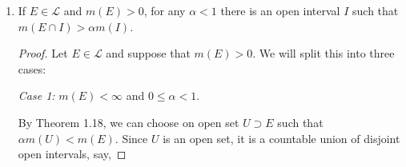 \documentclass[11pt,oneside,english]{amsart}
\theoremstyle{definition}
\newcommand{\MC}[1]{\mathcal{#1}}
\begin{document}
\begin{enumerate}
\begin{enumerate}
\begin{proof}
Let $E\subset N$ and let $E_r\subset N_r$ for each $r\in R$ as in Vitali's construction. Then $E_r\cap E_s=\varnothing$ for $r,s\in\mathbb{Q}$, and since $\bigcup_{r\in R}N_r=[0,1)$, we have

\[
1=m([0,1))=\sum_{r\in R} m(N_r)\geq\sum_{r\in R} m(E_r)=\sum_{r\in R}m(E)
\]

by monotonicity and translation invariance. If $m(E)>0$, then the sum on the right diverges, thus $m(E)=0$.

\end{proof}


\item If $m(E)>0$, then $E$ contains a nonmeasurable set. (It suffices to assume that $E\subset[0,1]$. In the notation of section 1.1, $E=\bigcup_{r\in R}E\cap N_r$.)

\begin{proof}
Let $E$ be Lebesgue measurable and suppose that $m(E)>0$. Assume further that $E\subset[0,1]$, and write $E_r=E\cap N_r$ for each $r\in R$. Then, since $\bigsqcup_{r\in R}N_r=[0,1)$,

\[
E=\bigsqcup_{r\in R}E_r.
\]

Now, suppose $E_r$ is measurable for some $r\in R$. Then, since $E_r\subset N_r$, and $m(N)=m(N_r)$, we have that $m(E_r)=0$ by part (a) and translation invariance. Thus,

\[
m(E)=\sum_{r\in R}m(E_r)=\sum_{r\in R}0=0,
\]

but this contradicts the fact that $m(E)>0$. Consequently at least one $E_r$ must be nonmeasurable, and since $E_r=E\cap N_r\subset E$, $E$ contains a nonmeasurable set.

\end{proof}

\end{enumerate}

\item If $E\in \MC{L}$ and $m(E)>0$, for any $\alpha<1$ there is an open interval $I$ such that $m(E\cap I)>\alpha m(I)$.

\begin{proof}

Let $E\in\MC{L}$ and suppose that $m(E)>0$. We will split this into three cases:

\textit{Case 1:} $m(E)<\infty$ and $0\leq \alpha <1$.

By Theorem 1.18, we can choose on open set $U\supset E$ such that $\alpha m(U)<m(E)$. Since $U$ is an open set, it is a countable union of disjoint open intervals, say,


\end{proof}
\end{enumerate}
\end{document}
